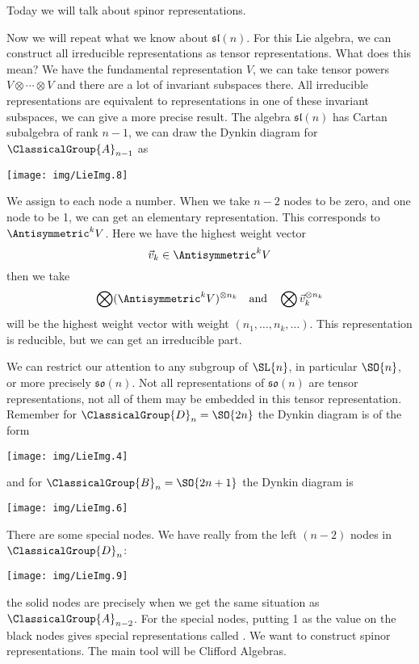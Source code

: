 \noindent\ignorespaces %
Today we will talk about spinor representations.

Now we will repeat what we know about $\mathfrak{sl}(n)$. For this
Lie algebra, we can construct all irreducible representations as
tensor representations. What does this mean? We have the
fundamental representation $V$, we can take tensor powers
$V\otimes\cdots\otimes V$ and there are a lot of invariant
subspaces there. All irreducible representations are equivalent
to representations in one of these invariant subspaces, we can
give a more precise result. The algebra $\mathfrak{sl}(n)$ has
Cartan subalgebra of rank $n-1$, we can draw the Dynkin diagram
for $\ClassicalGroup{A}_{n-1}$ as
\begin{center}
\texttt{[image: img/LieImg.8]}
\end{center}
We assign to each node a number. When we take $n-2$ nodes to be
zero, and one node to be 1, we can get an elementary representation.
This corresponds to $\Antisymmetric^{k}V$. Here we have the
highest weight vector
\begin{equation}
\vec{v}_{k}\in\Antisymmetric^{k}V
\end{equation}
then we take
\begin{equation}
\bigotimes(\Antisymmetric^{k}V)^{\otimes
  n_{k}}\quad\mbox{and}\quad\bigotimes \vec{v}_{k}^{\otimes n_{k}}
\end{equation}
will be the highest weight vector with weight
$(n_{1},\dots,n_{k},\dots)$. This representation is reducible,
but we can get an irreducible part.

We can restrict our attention to any subgroup of $\SL{n}$, in
particular $\SO{n}$, or more precisely $\mathfrak{so}(n)$. Not
all representations of $\mathfrak{so}(n)$ are tensor
representations, not all of them may be embedded in this tensor
representation. Remember for $\ClassicalGroup{D}_{n}=\SO{2n}$ the
Dynkin diagram is of the form
\begin{center}
\texttt{[image: img/LieImg.4]}
\end{center}
and for $\ClassicalGroup{B}_{n}=\SO{2n+1}$ the Dynkin diagram is
\begin{center}
\texttt{[image: img/LieImg.6]}
\end{center}
There are some special nodes. We have really from the left
$(n-2)$ nodes in $\ClassicalGroup{D}_{n}$:
\begin{center}
\texttt{[image: img/LieImg.9]}
\end{center}
the solid nodes are precisely when we get the same situation as
$\ClassicalGroup{A}_{n-2}$. For the special nodes, putting 1 as
the value on the black nodes gives special representations called
. We want to construct spinor
representations. The main tool will be Clifford Algebras.

